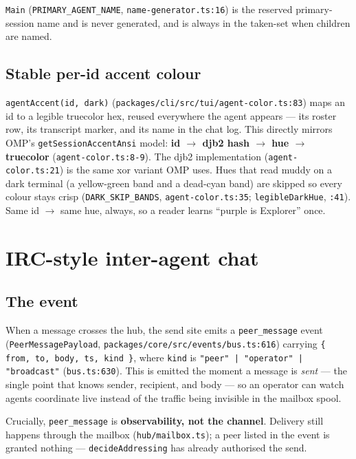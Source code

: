\documentclass[11pt]{article}
\begin{document}
\texttt{Main} (\texttt{PRIMARY\_AGENT\_NAME}, \texttt{name-generator.ts:16}) is the
reserved primary-session name and is never generated, and is always in the
taken-set when children are named.

\subsection{Stable per-id accent colour}

\texttt{agentAccent(id, dark)} (\texttt{packages/cli/src/tui/agent-color.ts:83})
maps an id to a legible truecolor hex, reused everywhere the agent appears --- its
roster row, its transcript marker, and its name in the chat log. This directly
mirrors OMP's \texttt{getSessionAccentAnsi} model:
\textbf{id $\rightarrow$ djb2 hash $\rightarrow$ hue $\rightarrow$ truecolor}
(\texttt{agent-color.ts:8-9}). The djb2 implementation (\texttt{agent-color.ts:21})
is the same xor variant OMP uses. Hues that read muddy on a dark terminal (a
yellow-green band and a dead-cyan band) are skipped so every colour stays crisp
(\texttt{DARK\_SKIP\_BANDS}, \texttt{agent-color.ts:35}; \texttt{legibleDarkHue},
\texttt{:41}). Same id $\rightarrow$ same hue, always, so a reader learns ``purple
is Explorer'' once.

\section{IRC-style inter-agent chat}

\subsection{The event}

When a message crosses the hub, the send site emits a \texttt{peer\_message} event
(\texttt{PeerMessagePayload}, \texttt{packages/core/src/events/bus.ts:616})
carrying \texttt{\{ from, to, body, ts, kind \}}, where \texttt{kind} is
\texttt{"peer" | "operator" | "broadcast"} (\texttt{bus.ts:630}). This is emitted
the moment a message is \textit{sent} --- the single point that knows sender,
recipient, and body --- so an operator can watch agents coordinate live instead of
the traffic being invisible in the mailbox spool.

Crucially, \texttt{peer\_message} is \textbf{observability, not the channel}.
Delivery still happens through the mailbox (\texttt{hub/mailbox.ts}); a peer listed
in the event is granted nothing --- \texttt{decideAddressing} has already
authorised the send.
\end{document}
